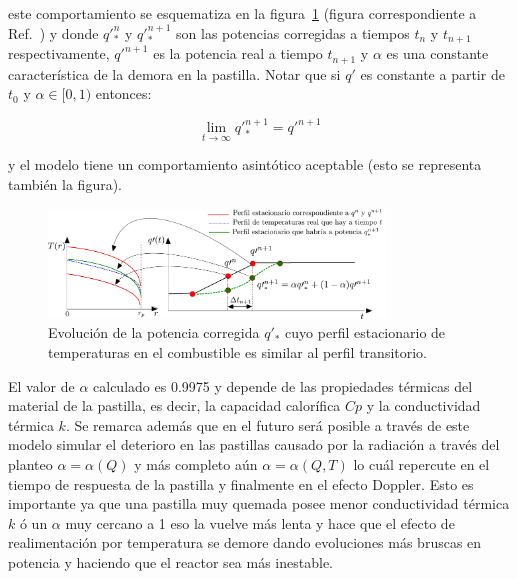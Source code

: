 \documentclass[11pt]{article}
\begin{document}
\noindent
este comportamiento se esquematiza en la figura~\ref{fig:correc_pow} (figura correspondiente a Ref.~\cite{modelos-pastilla-relap}) y donde $q\prime^{n}_{*}$ y $q\prime^{n+1}_{*}$ son las potencias corregidas a tiempos $t_{n}$ y $t_{n+1}$ respectivamente, $q\prime^{n+1}$ es la potencia real a tiempo $t_{n+1}$ y $\alpha$ es una constante característica de la demora en la pastilla. Notar que si $q\prime$ es constante a partir de $t_{0}$ y $\alpha\in[0,1)$ entonces:

\begin{equation}
\lim_{t \rightarrow \infty} q\prime^{n+1}_{*} =  q\prime^{n+1}
\end{equation}

\noindent
y el modelo tiene un comportamiento asintótico aceptable (esto se representa también la figura).

\begin{figure}[htbl!]
\begin{center}
\includegraphics[width=0.8\textwidth]{imagenes/correc_pow.pdf}
\end{center}
\caption[Evolución de la potencia corregida $q\prime_{*}$ cuyo perfil estacionario de temperaturas en el combustible es similar al perfil transitorio.]{\label{fig:correc_pow} Evolución de la potencia corregida $q\prime_{*}$ cuyo perfil estacionario de temperaturas en el combustible es similar al perfil transitorio.}
\end{figure}

El valor de $\alpha$ calculado es \num{0.9975} y depende de las propiedades térmicas del material de la pastilla, es decir, la capacidad calorífica $Cp$ y la conductividad térmica $k$. Se remarca además que en el futuro será posible a través de este modelo simular el deterioro en las pastillas causado por la radiación a través del planteo $\alpha=\alpha(Q)$ y más completo aún $\alpha=\alpha(Q,T)$ lo cuál repercute en el tiempo de respuesta de la pastilla y finalmente en el efecto Doppler. Esto es importante ya que una pastilla muy quemada posee menor conductividad térmica $k$ ó un $\alpha$ muy cercano a \num{1} eso la vuelve más lenta y hace que el efecto de realimentación por temperatura se demore dando evoluciones más bruscas en potencia y haciendo que el reactor sea más inestable.
\end{document}
